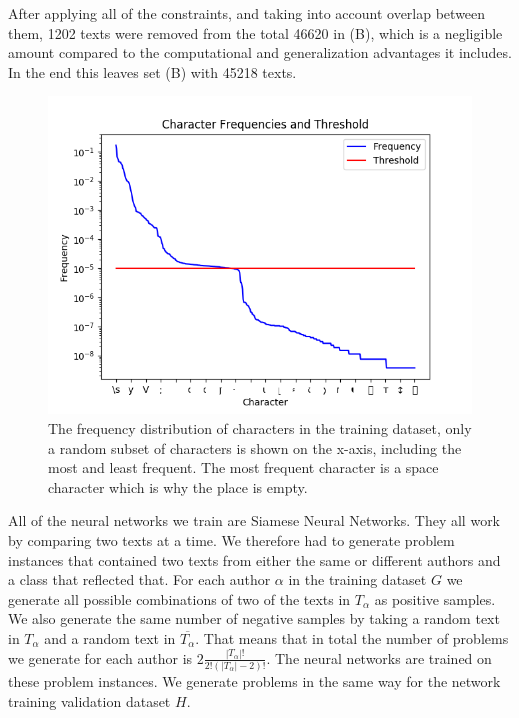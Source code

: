 After applying all of the constraints, and taking into account
overlap between them, 1202 texts were removed from the total 46620 in (B),
which is a negligible amount compared to the computational and generalization
advantages it includes.
In the end this leaves set (B) with 45218 texts.

\begin{figure}[htb]
    \centering
    \includegraphics[scale=.8]{./pictures/data/character_frequencies.png}
    \caption{The frequency distribution of characters in the training dataset,
        only a random subset of characters is shown on the x-axis, including the
        most and least frequent. The most frequent character is a space
        character which is why the place is empty.}
    \label{fig:character_frequencies}
\end{figure}

All of the neural networks we train are Siamese Neural Networks. They all
work by comparing two texts at a time. We therefore had to generate problem
instances that contained two texts from either the same or different authors and
a class that reflected that. For each author $\alpha$ in the training dataset
$G$ we generate all possible combinations of two of the texts in $T_\alpha$
as positive samples. We also generate the same number of negative samples by
taking a random text in $T_\alpha$ and a random text in $\overline{T_\alpha}$.
That means that in total the number of problems we generate for each author
is $2\frac{\left|T_\alpha\right|!}{2!(\left|T_\alpha\right|-2)!}$. The neural
networks are trained on these problem instances. We generate problems in the
same way for the network training validation dataset $H$.
